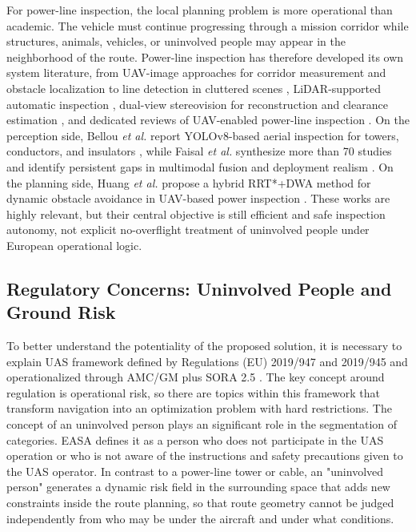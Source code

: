 \documentclass[journal,twoside,web]{ieeecolor}
\begin{document}
For power-line inspection, the local planning problem is more operational than academic. The vehicle must continue progressing through a mission corridor while structures, animals, vehicles, or uninvolved people may appear in the neighborhood of the route. Power-line inspection has therefore developed its own system literature, from UAV-image approaches for corridor measurement and obstacle localization \cite{zhang2017powerline} to line detection in cluttered scenes \cite{zhang2019powerlines}, LiDAR-supported automatic inspection \cite{guan2021uavlidar}, dual-view stereovision for reconstruction and clearance estimation \cite{zhou2022dualview}, and dedicated reviews of UAV-enabled power-line inspection \cite{mendu2025state}. On the perception side, Bellou \emph{et al.} report YOLOv8-based aerial inspection for towers, conductors, and insulators \cite{bellou2024aerial}, while Faisal \emph{et al.} synthesize more than 70 studies and identify persistent gaps in multimodal fusion and deployment realism \cite{faisal2025deep}. On the planning side, Huang \emph{et al.} propose a hybrid RRT*+DWA method for dynamic obstacle avoidance in UAV-based power inspection \cite{huang2025hybrid}. These works are highly relevant, but their central objective is still efficient and safe inspection autonomy, not explicit no-overflight treatment of uninvolved people under European operational logic.

\subsection{Regulatory Concerns: Uninvolved People and Ground Risk}

To better understand the potentiality of the proposed solution, it is necessary to explain UAS framework defined by Regulations (EU) 2019/947 and 2019/945 and operationalized through AMC/GM plus SORA 2.5 \cite{EU2019_947,EU2019_945,JARUS_SORA_2_5_2024,EASA_AMC_GM_SORA25_2025}. The key concept around regulation is operational risk, so there are topics within this framework that transform navigation into an optimization problem with hard restrictions. The concept of an uninvolved person plays an significant role in the segmentation of categories. EASA defines it as a person who does not participate in the UAS operation or who is not aware of the instructions and safety precautions given to the UAS operator. In contrast to a power-line tower or cable, an "uninvolved person" generates a dynamic risk field in the surrounding space that adds new constraints inside the route planning, so that route geometry cannot be judged independently from who may be under the aircraft and under what conditions. 
\end{document}
